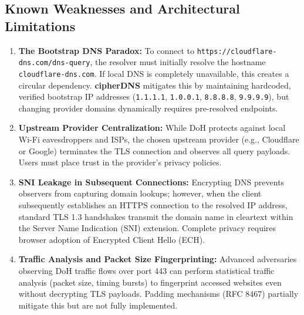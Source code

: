 \documentclass[10pt,a4paper]{article}
\begin{document}
\subsection{Known Weaknesses and Architectural Limitations}
\begin{enumerate}\itemsep 2pt
    \item \textbf{The Bootstrap DNS Paradox:} To connect to \texttt{https://cloudflare-dns.com/dns-query}, the resolver must initially resolve the hostname \texttt{cloudflare-dns.com}. If local DNS is completely unavailable, this creates a circular dependency. \textbf{cipherDNS} mitigates this by maintaining hardcoded, verified bootstrap IP addresses (\texttt{1.1.1.1}, \texttt{1.0.0.1}, \texttt{8.8.8.8}, \texttt{9.9.9.9}), but changing provider domains dynamically requires pre-resolved endpoints.
    \item \textbf{Upstream Provider Centralization:} While DoH protects against local Wi-Fi eavesdroppers and ISPs, the chosen upstream provider (e.g., Cloudflare or Google) terminates the TLS connection and observes all query payloads. Users must place trust in the provider's privacy policies.
    \item \textbf{SNI Leakage in Subsequent Connections:} Encrypting DNS prevents observers from capturing domain lookups; however, when the client subsequently establishes an HTTPS connection to the resolved IP address, standard TLS 1.3 handshakes transmit the domain name in cleartext within the Server Name Indication (SNI) extension. Complete privacy requires browser adoption of Encrypted Client Hello (ECH).
    \item \textbf{Traffic Analysis and Packet Size Fingerprinting:} Advanced adversaries observing DoH traffic flows over port 443 can perform statistical traffic analysis (packet size, timing bursts) to fingerprint accessed websites even without decrypting TLS payloads. Padding mechanisms (RFC 8467) partially mitigate this but are not fully implemented.
\end{enumerate}
\end{document}
